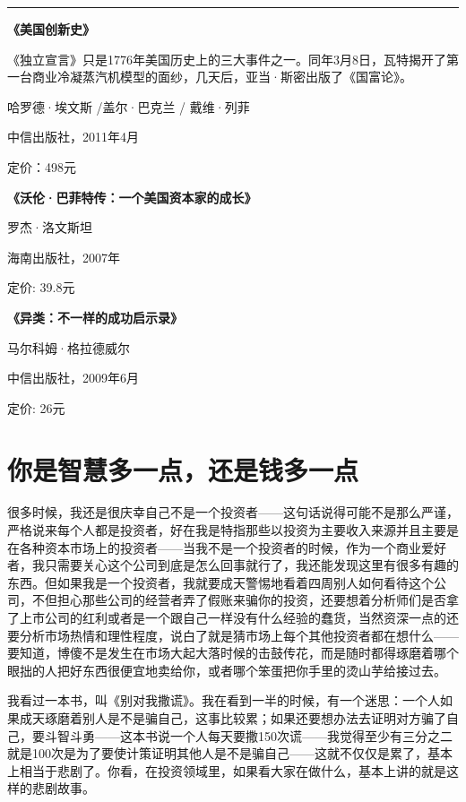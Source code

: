 \begin{center}\rule{0.5\linewidth}{0.5pt}\end{center}

\textbf{《美国创新史》}

《独立宣言》只是1776年美国历史上的三大事件之一。同年3月8日，瓦特揭开了第一台商业冷凝蒸汽机模型的面纱，几天后，亚当·斯密出版了《国富论》。

哈罗德·埃文斯 /盖尔·巴克兰 / 戴维·列菲

中信出版社，2011年4月

定价：498元

\textbf{《沃伦·巴菲特传：一个美国资本家的成长》}

罗杰·洛文斯坦

海南出版社，2007年

定价: 39.8元

\textbf{《异类：不一样的成功启示录》}

马尔科姆·格拉德威尔

中信出版社，2009年6月

定价: 26元

\hypertarget{ux4f60ux662fux667aux6167ux591aux4e00ux70b9ux8fd8ux662fux94b1ux591aux4e00ux70b9}{%
\section{你是智慧多一点，还是钱多一点}\label{ux4f60ux662fux667aux6167ux591aux4e00ux70b9ux8fd8ux662fux94b1ux591aux4e00ux70b9}}

很多时候，我还是很庆幸自己不是一个投资者------这句话说得可能不是那么严谨，严格说来每个人都是投资者，好在我是特指那些以投资为主要收入来源并且主要是在各种资本市场上的投资者------当我不是一个投资者的时候，作为一个商业爱好者，我只需要关心这个公司到底是怎么回事就行了，我还能发现这里有很多有趣的东西。但如果我是一个投资者，我就要成天警惕地看着四周别人如何看待这个公司，不但担心那些公司的经营者弄了假账来骗你的投资，还要想着分析师们是否拿了上市公司的红利或者是一个跟自己一样没有什么经验的蠢货，当然资深一点的还要分析市场热情和理性程度，说白了就是猜市场上每个其他投资者都在想什么------要知道，博傻不是发生在市场大起大落时候的击鼓传花，而是随时都得琢磨着哪个眼拙的人把好东西很便宜地卖给你，或者哪个笨蛋把你手里的烫山芋给接过去。

我看过一本书，叫《别对我撒谎》。我在看到一半的时候，有一个迷思：一个人如果成天琢磨着别人是不是骗自己，这事比较累；如果还要想办法去证明对方骗了自己，要斗智斗勇------这本书说一个人每天要撒150次谎------我觉得至少有三分之二就是100次是为了要使计策证明其他人是不是骗自己------这就不仅仅是累了，基本上相当于悲剧了。你看，在投资领域里，如果看大家在做什么，基本上讲的就是这样的悲剧故事。

